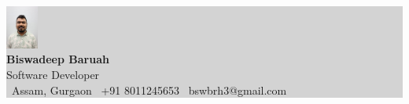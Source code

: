 \documentclass[10pt,a4paper]{article}
\begin{document}
\pagestyle{empty}

\begin{center}
    \colorbox{lightgray}{%
        \begin{minipage}{\textwidth}
            \centering
            \vspace{8pt}
            \includegraphics[width=0.08\textwidth,height=0.08\textwidth,keepaspectratio,clip]{passport_photo.jpeg} \\
            \vspace{4mm}
            {\Huge \textbf{\color{darkblue}Biswadeep Baruah}} \\
            \vspace{2mm}
            {\Large \color{primaryblue} Software Developer} \\
            \vspace{2mm}
            {\color{mediumgray} \faMapMarker\ Assam, Gurgaon \quad \faPhone\ +91 8011245653 \quad \faEnvelope\ bswbrh3@gmail.com}
            \vspace{8pt}
        \end{minipage}
    }
\end{center}
\vspace{3mm}
\end{document}
